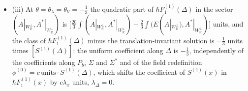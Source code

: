 \begin{theorem}
\begin{itemize}
\[\]
with $T_1,\dots,T_4$ the terms of Table \ref{tab:c11-terms} and $\Gamma(\xi,\lambda)^\mu$ the component of $\Gamma(\xi,\lambda)|_V$ along $e_\mu$, and at these values $\hbar F_1^{(2)}(\Delta,\xi)=\log\tfrac43\,\text{units}\cdot(\psi_1+\psi_2)$ plus $Q$-closed functionals.
\item (iii) At $\theta=\theta_\lambda=\theta_V=-\tfrac13$ the quadratic part of $\hbar F_1^{(1)}(\Delta)$ in the sector $(A|_{W_{\mathbb R}^\perp},A^*|_{W_{\mathbb R}^\perp})$ is $\big[\tfrac{20}3\int(A|_{W_{\mathbb R}^\perp},A^*|_{W_{\mathbb R}^\perp})-\tfrac23\int(E(A|_{W_{\mathbb R}^\perp}),A^*|_{W_{\mathbb R}^\perp})\big]$ units, and the class of $\hbar F_1^{(1)}(\Delta)$ minus the translation-invariant solution is $-\tfrac13$ units times $[S^{(1)}(\Delta)]$: the uniform coefficient along $\Delta$ is $-\tfrac13$, independently of the coefficients along $P_b$, $\Sigma$ and $\Sigma^*$ and of the field redefinition $\phi^{(0)}=c\,\text{units}\cdot S^{(1)}(\Delta)$, which shifts the coefficient of $S^{(1)}(x)$ in $\hbar F_1^{(1)}(x)$ by $c\lambda_x$ units, $\lambda_\Delta=0$.
\end{itemize}
\end{theorem}

